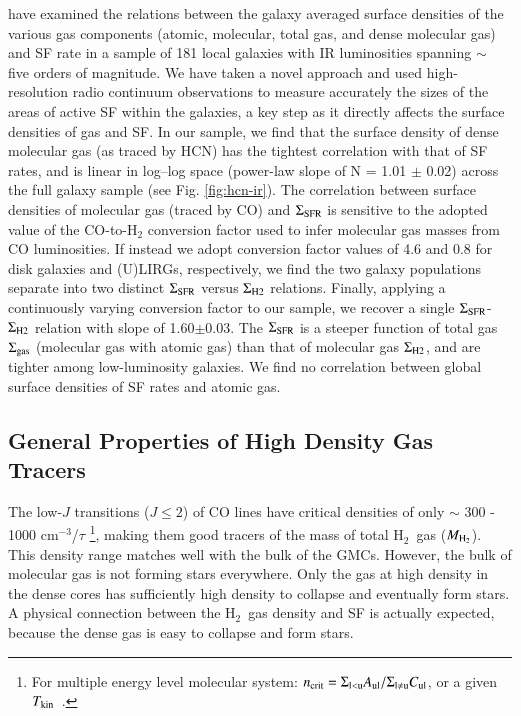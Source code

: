 \documentclass[legal,11pt]{article}
\def\cmt   {cm$^{-3}$\,}
\def\,{\thinspace}
\def\Htwo{H$_2$}
\def\MHtwo{$M_{\rm H_2}$}
\def\Tkin{$T_{\rm kin}$}
\def\Htwo       {H$_2$}
\begin{document}
\cite{lgg2015} have examined the relations between the galaxy averaged surface
densities of the various gas components (atomic, molecular, total gas, and
dense molecular gas) and SF rate in a sample of 181 local galaxies with IR
luminosities spanning $\sim$ five orders of magnitude. We have taken a novel
approach and used high-resolution radio continuum observations to measure
accurately the sizes of the areas of active SF within the galaxies, a key step
as it directly affects the surface densities of gas and SF. In our
sample, we find that the surface density of dense molecular gas (as traced by
HCN) has the tightest correlation with that of SF rates, and is linear in
log–log space (power-law slope of N = 1.01 $\pm$ 0.02) across the full galaxy
sample (see Fig. \ref{fig:hcn-ir}). The correlation between surface densities
of molecular gas (traced by CO) and $\Sigma_{\rm SFR}$ is sensitive to the
adopted value of the CO-to-H$_2$ conversion factor used to infer molecular gas
masses from CO luminosities. If instead we adopt conversion factor values  of
4.6 and 0.8 for disk galaxies and (U)LIRGs, respectively, we find the two
galaxy populations separate into two distinct $\Sigma_{\rm SFR}$  versus
$\Sigma_{\rm H2}$ relations. Finally, applying a continuously varying
conversion factor to our sample, we recover a single $\Sigma_{\rm
SFR}$-$\Sigma_{\rm H2}$  relation with slope of 1.60$\pm$0.03. The $\Sigma_{\rm
SFR}$ is a steeper function of total gas $\Sigma_{\rm gas}$ (molecular gas with
atomic gas) than that of molecular gas $\Sigma_{\rm H2}$, and are tighter among
low-luminosity galaxies. We find no correlation between global surface
densities of SF rates and atomic gas.

\subsection{General Properties of High Density Gas Tracers  }

The low-$J$ transitions ($J\le2$) of CO lines have critical densities of only
$\sim$ 300 - 1000 \cmt/$\tau$ \footnote{For multiple energy level molecular
system: $n_{\rm crit}={\Sigma_{\rm l<u} A_{\rm ul}}/{\Sigma_{\rm l\neq u}
C_{\rm ul}}$, or a given \Tkin\ \citep{Jansen1995, Osterbrock2006}.}, making them good
tracers of the mass of total \Htwo\ gas (\MHtwo). This density range matches
well with the bulk of the GMCs. However, the bulk of molecular gas is not
forming stars everywhere.  Only the gas at high density in the dense cores has
sufficiently high density to collapse and eventually form stars.  A physical
connection between the \Htwo\ gas density and SF is actually expected, because
the dense gas is easy to collapse and form stars.
\end{document}
